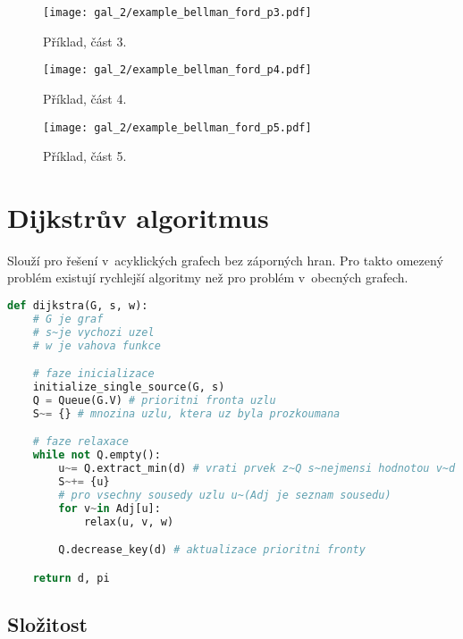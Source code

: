 \begin{figure}[H]
    \centering
    \texttt{[image: gal\_2/example\_bellman\_ford\_p3.pdf]}
    \caption{Příklad, část 3.}
\end{figure}

\begin{figure}[H]
    \centering
    \texttt{[image: gal\_2/example\_bellman\_ford\_p4.pdf]}
    \caption{Příklad, část 4.}
\end{figure}

\begin{figure}[H]
    \centering
    \texttt{[image: gal\_2/example\_bellman\_ford\_p5.pdf]}
    \caption{Příklad, část 5.}
\end{figure}


\section{Dijkstrův algoritmus}

Slouží pro řešení v~acyklických grafech bez záporných hran. Pro takto omezený problém existují rychlejší algoritmy než pro problém v~obecných grafech.

\bigskip\noindent\begin{minipage}{\linewidth}
\begin{lstlisting}[language=Python, caption={Algoritmus Dijkstra.}]
def dijkstra(G, s, w):
    # G je graf
    # s~je vychozi uzel
    # w je vahova funkce

    # faze inicializace
    initialize_single_source(G, s)
    Q = Queue(G.V) # prioritni fronta uzlu
    S~= {} # mnozina uzlu, ktera uz byla prozkoumana

    # faze relaxace
    while not Q.empty():
        u~= Q.extract_min(d) # vrati prvek z~Q s~nejmensi hodnotou v~d
        S~+= {u}
        # pro vsechny sousedy uzlu u~(Adj je seznam sousedu)
        for v~in Adj[u]:
            relax(u, v, w)

        Q.decrease_key(d) # aktualizace prioritni fronty

    return d, pi
\end{lstlisting}
\end{minipage}

\subsection*{Složitost}

